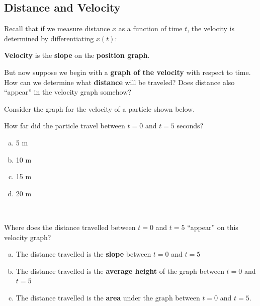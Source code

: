\newpage


 \subsection*{Distance and Velocity}

 Recall that if we measure distance $x$ as a function of time $t$, the
 velocity is determined by differentiating $x(t)$: 
 \begin{center}
{\bf Velocity} is the {\bf slope} on the {\bf position graph}.
 \end{center}

 But now suppose we begin with a {\bf graph of the velocity} with
 respect to time.  How can we determine what {\bf distance} will be
 traveled?  Does distance also ``appear'' in the velocity graph
 somehow?

\newpage

\problem 
 Consider the graph for the velocity of a particle shown below. 
\begin{center}
\end{center}
How far did the particle travel between $t=0$ and $t=5$ seconds?
\begin{enumerate}[(a)]
\item 5 m\\[1ex]
\item 10 m\\[1ex]
\item 15 m\\[1ex]
\item 20 m
\end{enumerate}

\newpage
\problem 
~
\begin{center}
\end{center}

Where does the distance travelled between $t=0$ and $t=5$ ``appear''
on this velocity graph?
\begin{enumerate}[(a)]
\item The distance travelled is the {\bf slope} between $t=0$ and $t=5$  \\[1ex]
\item The distance travelled is the {\bf average height} of the graph between $t=0$ and $t=5$  \\[1ex]
\item The distance travelled is the {\bf area} under the graph between $t=0$
  and $t=5$.
\end{enumerate}


